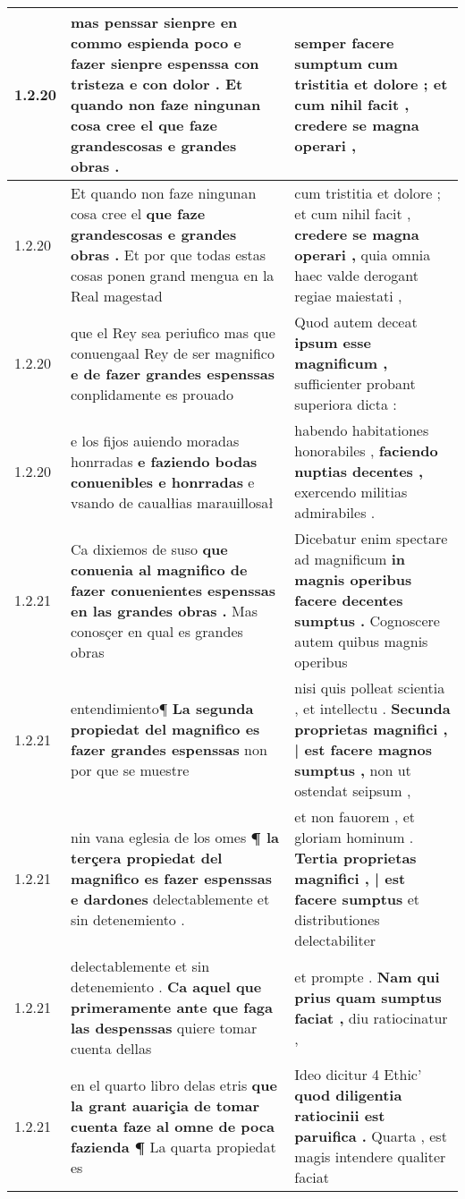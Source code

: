 \begin{tabular}{|p{1cm}|p{6.5cm}|p{6.5cm}|}
1.2.20 & mas penssar sienpre en commo espienda poco e fazer sienpre espenssa con tristeza e con dolor . \textbf{ Et quando non faze ningunan cosa cree el } que faze grandescosas e grandes obras . & semper facere sumptum \textbf{ cum tristitia et dolore ; et cum nihil facit , } credere se magna operari , \\\hline
1.2.20 & Et quando non faze ningunan cosa cree el \textbf{ que faze grandescosas e grandes obras . } Et por que todas estas cosas ponen grand mengua en la Real magestad & cum tristitia et dolore ; et cum nihil facit , \textbf{ credere se magna operari , } quia omnia haec valde derogant regiae maiestati , \\\hline
1.2.20 & que el Rey sea periufico mas que conuengaal Rey de ser magnifico \textbf{ e de fazer grandes espenssas } conplidamente es prouado & Quod autem deceat \textbf{ ipsum esse magnificum , } sufficienter probant superiora dicta : \\\hline
1.2.20 & e los fijos auiendo moradas honrradas \textbf{ e faziendo bodas conuenibles e honrradas } e vsando de caualłias marauillosał & habendo habitationes honorabiles , \textbf{ faciendo nuptias decentes , } exercendo militias admirabiles . \\\hline
1.2.21 & Ca dixiemos de suso \textbf{ que conuenia al magnifico de fazer conuenientes espenssas en las grandes obras . } Mas conosçer en qual es grandes obras & Dicebatur enim spectare ad magnificum \textbf{ in magnis operibus facere decentes sumptus . } Cognoscere autem quibus magnis operibus \\\hline
1.2.21 & entendimiento¶ \textbf{ La segunda propiedat del magnifico es fazer grandes espenssas } non por que se muestre & nisi quis polleat scientia , et intellectu . \textbf{ Secunda proprietas magnifici , | est facere magnos sumptus , } non ut ostendat seipsum , \\\hline
1.2.21 & nin vana eglesia de los omes \textbf{ ¶ la terçera propiedat del magnifico es fazer espenssas e dardones } delectablemente et sin detenemiento . & et non fauorem , et gloriam hominum . \textbf{ Tertia proprietas magnifici , | est facere sumptus } et distributiones delectabiliter \\\hline
1.2.21 & delectablemente et sin detenemiento . \textbf{ Ca aquel que primeramente ante que faga las despenssas } quiere tomar cuenta dellas & et prompte . \textbf{ Nam qui prius quam sumptus faciat , } diu ratiocinatur , \\\hline
1.2.21 & en el quarto libro delas etris \textbf{ que la grant auariçia de tomar cuenta faze al omne de poca fazienda ¶ } La quarta propiedat es & Ideo dicitur 4 Ethic’ \textbf{ quod diligentia ratiocinii est paruifica . } Quarta , est magis intendere qualiter faciat \\\hline

\end{tabular}
